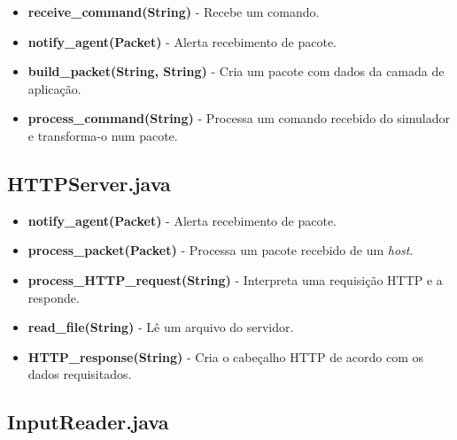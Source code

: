 \documentclass[11pt]{article}
\begin{document}
\begin{itemize}
	\item \textbf{receive\_command(String)} - Recebe um comando.
	\item \textbf{notify\_agent(Packet)} - Alerta recebimento de pacote.
	\item \textbf{build\_packet(String, String)} - Cria um pacote com dados da camada de aplicação.
	\item \textbf{process\_command(String)} - Processa um comando recebido do simulador e transforma-o num pacote.
\end{itemize}

\subsection{HTTPServer.java}

\begin{itemize}
	\item \textbf{notify\_agent(Packet)} - Alerta recebimento de pacote.
	\item \textbf{process\_packet(Packet)} - Processa um pacote recebido de um \textit{host}.
	\item \textbf{process\_HTTP\_request(String)} - Interpreta uma requisição HTTP e a responde.
	\item \textbf{read\_file(String)} - Lê um arquivo do servidor.
	\item \textbf{HTTP\_response(String)} - Cria o cabeçalho HTTP de acordo com os dados requisitados.
\end{itemize}

\subsection{InputReader.java}
\end{document}
